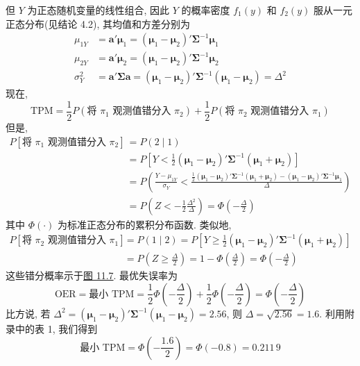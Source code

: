 
但 $Y$ 为正态随机变量的线性组合, 因此 $Y$ 的概率密度 $f_1(y)$ 和 $f_2(y)$ 服从一元正态分布(见结论 4.2), 其均值和方差分别为
\[
\begin{aligned}
\mu_{1Y}&=\mathbf{a}'\boldsymbol{\mu}_1=(\boldsymbol{\mu}_1-\boldsymbol{\mu}_2)'\boldsymbol{\Sigma}^{-1}\boldsymbol{\mu}_1\\
\mu_{2Y}&=\mathbf{a}'\boldsymbol{\mu}_2=(\boldsymbol{\mu}_1-\boldsymbol{\mu}_2)'\boldsymbol{\Sigma}^{-1}\boldsymbol{\mu}_2\\
\sigma_Y^2&=\mathbf{a}'\boldsymbol{\Sigma}\mathbf{a}=(\boldsymbol{\mu}_1-\boldsymbol{\mu}_2)'\boldsymbol{\Sigma}^{-1}(\boldsymbol{\mu}_1-\boldsymbol{\mu}_2)=\Delta^2
\end{aligned}
\]
现在,
\[
\mathrm{TPM}=\frac{1}{2}P(\text{将 }\pi_1\text{ 观测值错分入 }\pi_2)+\frac{1}{2}P(\text{将 }\pi_2\text{ 观测值错分入 }\pi_1)
\]
但是,
\[
\begin{aligned}
P[\text{将 }\pi_1\text{ 观测值错分入 }\pi_2]&=P(2\mid1)\\
&=P\left[Y<\frac{1}{2}(\boldsymbol{\mu}_1-\boldsymbol{\mu}_2)'\boldsymbol{\Sigma}^{-1}(\boldsymbol{\mu}_1+\boldsymbol{\mu}_2)\right]\\
&=P\left(\frac{Y-\mu_{1Y}}{\sigma_Y}<\frac{\frac{1}{2}(\boldsymbol{\mu}_1-\boldsymbol{\mu}_2)'\boldsymbol{\Sigma}^{-1}(\boldsymbol{\mu}_1+\boldsymbol{\mu}_2)-(\boldsymbol{\mu}_1-\boldsymbol{\mu}_2)'\boldsymbol{\Sigma}^{-1}\boldsymbol{\mu}_1}{\Delta}\right)\\
&=P\left(Z<-\frac{1}{2}\frac{\Delta^2}{\Delta}\right)=\Phi\left(-\frac{\Delta}{2}\right)
\end{aligned}
\]
其中 $\Phi(\cdot)$ 为标准正态分布的累积分布函数. 类似地,
\[
\begin{aligned}
P[\text{将 }\pi_2\text{ 观测值错分入 }\pi_1]&=P(1\mid2)=P\left[Y\geqslant\frac{1}{2}(\boldsymbol{\mu}_1-\boldsymbol{\mu}_2)'\boldsymbol{\Sigma}^{-1}(\boldsymbol{\mu}_1+\boldsymbol{\mu}_2)\right]\\
&=P\left(Z\geqslant\frac{\Delta}{2}\right)=1-\Phi\left(\frac{\Delta}{2}\right)=\Phi\left(-\frac{\Delta}{2}\right)
\end{aligned}
\]
这些错分概率示于\hyperref[fig:11.7]{图 11.7}. 最优失误率为
\label{eq:11-31}
\begin{equation}
\mathrm{OER}=\text{最小 TPM}=\frac{1}{2}\Phi\left(-\frac{\Delta}{2}\right)+\frac{1}{2}\Phi\left(-\frac{\Delta}{2}\right)=\Phi\left(-\frac{\Delta}{2}\right)
\tag{11-31}
\end{equation}
比方说, 若 $\Delta^2=(\boldsymbol{\mu}_1-\boldsymbol{\mu}_2)'\boldsymbol{\Sigma}^{-1}(\boldsymbol{\mu}_1-\boldsymbol{\mu}_2)=2.56$, 则 $\Delta=\sqrt{2.56}=1.6$. 利用附录中的表 1, 我们得到
\[
\text{最小 TPM}=\Phi\left(-\frac{1.6}{2}\right)=\Phi(-0.8)=0.211\,9
\]

